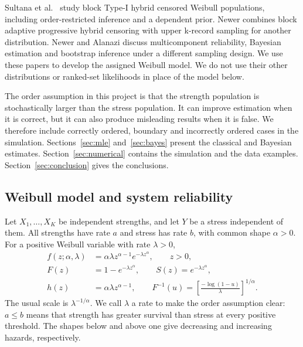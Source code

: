 \documentclass[a4paper,11pt]{article}
\begin{document}
Sultana et al.\ \cite{Sultana2026} study block Type-I hybrid censored Weibull populations, including order-restricted inference and a dependent prior. Newer \cite{Newer2025} combines block adaptive progressive hybrid censoring with upper k-record sampling for another distribution. Newer and Alanazi \cite{NewerAlanazi2026} discuss multicomponent reliability, Bayesian estimation and bootstrap inference under a different sampling design. We use these papers to develop the assigned Weibull model. We do not use their other distributions or ranked-set likelihoods in place of the model below.

The order assumption in this project is that the strength population is stochastically larger than the stress population. It can improve estimation when it is correct, but it can also produce misleading results when it is false. We therefore include correctly ordered, boundary and incorrectly ordered cases in the simulation. Sections~\ref{sec:mle} and~\ref{sec:bayes} present the classical and Bayesian estimates. Section~\ref{sec:numerical} contains the simulation and the data examples. Section~\ref{sec:conclusion} gives the conclusions.



\subsection{Weibull model and system reliability}\label{sec:model}
Let $X_1,\ldots,X_K$ be independent strengths, and let $Y$ be a stress independent of them. All strengths have rate $a$ and stress has rate $b$, with common shape $\alpha>0$. For a positive Weibull variable with rate $\lambda>0$,
\begin{align}
f(z;\alpha,\lambda)&=\alpha\lambda z^{\alpha-1}e^{-\lambda z^\alpha},\qquad z>0,\label{eq:density}\\
F(z)&=1-e^{-\lambda z^\alpha},\qquad S(z)=e^{-\lambda z^\alpha},\label{eq:survival}\\
h(z)&=\alpha\lambda z^{\alpha-1},\qquad
F^{-1}(u)=\left[\frac{-\log(1-u)}{\lambda}\right]^{1/\alpha}.\label{eq:quantile}
\end{align}
The usual scale is $\lambda^{-1/\alpha}$. We call $\lambda$ a rate to make the order assumption clear: $a\le b$ means that strength has greater survival than stress at every positive threshold. The shapes below and above one give decreasing and increasing hazards, respectively.
\end{document}
